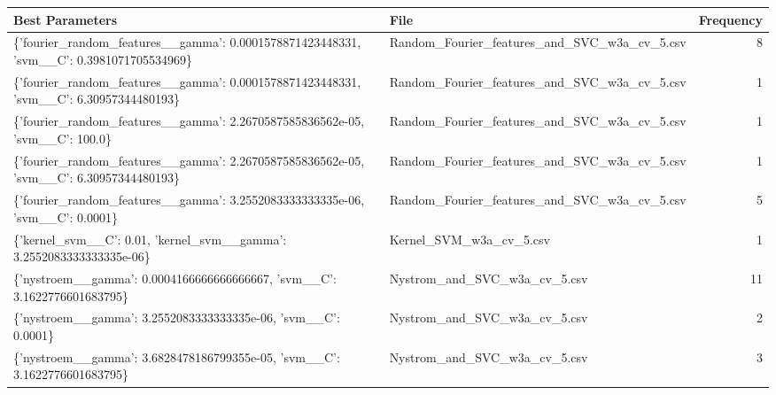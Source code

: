 \begin{tabularx}{\textwidth}{llr}
\toprule
                                                                        Best Parameters &                                         File &  Frequency \\
\midrule
\{'fourier\_random\_features\_\_gamma': 0.0001578871423448331, 'svm\_\_C': 0.3981071705534969\} & Random\_Fourier\_features\_and\_SVC\_w3a\_cv\_5.csv &          8 \\
  \{'fourier\_random\_features\_\_gamma': 0.0001578871423448331, 'svm\_\_C': 6.30957344480193\} & Random\_Fourier\_features\_and\_SVC\_w3a\_cv\_5.csv &          1 \\
            \{'fourier\_random\_features\_\_gamma': 2.2670587585836562e-05, 'svm\_\_C': 100.0\} & Random\_Fourier\_features\_and\_SVC\_w3a\_cv\_5.csv &          1 \\
 \{'fourier\_random\_features\_\_gamma': 2.2670587585836562e-05, 'svm\_\_C': 6.30957344480193\} & Random\_Fourier\_features\_and\_SVC\_w3a\_cv\_5.csv &          1 \\
           \{'fourier\_random\_features\_\_gamma': 3.2552083333333335e-06, 'svm\_\_C': 0.0001\} & Random\_Fourier\_features\_and\_SVC\_w3a\_cv\_5.csv &          5 \\
                   \{'kernel\_svm\_\_C': 0.01, 'kernel\_svm\_\_gamma': 3.2552083333333335e-06\} &                      Kernel\_SVM\_w3a\_cv\_5.csv &          1 \\
               \{'nystroem\_\_gamma': 0.0004166666666666667, 'svm\_\_C': 3.1622776601683795\} &                 Nystrom\_and\_SVC\_w3a\_cv\_5.csv &         11 \\
                          \{'nystroem\_\_gamma': 3.2552083333333335e-06, 'svm\_\_C': 0.0001\} &                 Nystrom\_and\_SVC\_w3a\_cv\_5.csv &          2 \\
              \{'nystroem\_\_gamma': 3.6828478186799355e-05, 'svm\_\_C': 3.1622776601683795\} &                 Nystrom\_and\_SVC\_w3a\_cv\_5.csv &          3 \\
\bottomrule
\end{tabularx}
